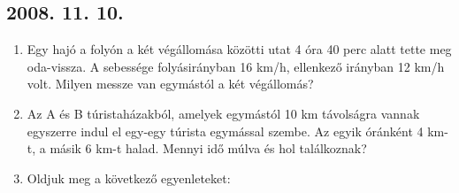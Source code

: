 \subsection*{2008. 11. 10.}
\begin{enumerate}
\item Egy hajó a folyón a két végállomása közötti utat 4 óra 40 perc alatt tette meg oda-vissza. A sebessége folyásirányban 16 km/h, ellenkező irányban 12 km/h volt. Milyen messze van egymástól a két végállomás?
\item Az A és B túristaházakból, amelyek egymástól 10 km távolságra vannak egyszerre indul el egy-egy túrista egymással szembe. Az egyik óránként 4 km-t, a másik 6 km-t halad. Mennyi idő múlva és hol találkoznak?
\item Oldjuk meg a következő egyenleteket:
\end{enumerate}


